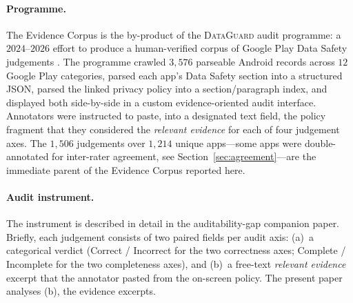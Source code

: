 \documentclass[11pt,a4paper]{article}
\newcommand{\dataguard}{\textsc{DataGuard}}
\begin{document}
\paragraph{Programme.}
The Evidence Corpus is the by-product of the \dataguard{} audit
programme: a $2024$--$2026$ effort to produce a human-verified corpus
of Google Play Data Safety judgements
\citep{khandelwal2024unpacking,googledatasafety2022}. The programme
crawled $3{,}576$ parseable Android records across $12$ Google Play
categories, parsed each app's Data Safety section into a structured
JSON, parsed the linked privacy policy into a section/paragraph index,
and displayed both side-by-side in a custom evidence-oriented audit
interface. Annotators were instructed to paste, into a designated
text field, the policy fragment that they considered the
\emph{relevant evidence} for each of four judgement axes. The
$1{,}506$ judgements over $1{,}214$ unique apps---some apps were
double-annotated for inter-rater agreement, see
Section~\ref{sec:agreement}---are the immediate parent of the
Evidence Corpus reported here.

\paragraph{Audit instrument.}
The instrument is described in detail in the auditability-gap
companion paper. Briefly, each judgement consists of two paired
fields per audit axis: (a)~a categorical verdict (Correct / Incorrect
for the two correctness axes; Complete / Incomplete for the two
completeness axes), and (b)~a free-text \emph{relevant evidence}
excerpt that the annotator pasted from the on-screen policy. The
present paper analyses (b), the evidence excerpts.
\end{document}
